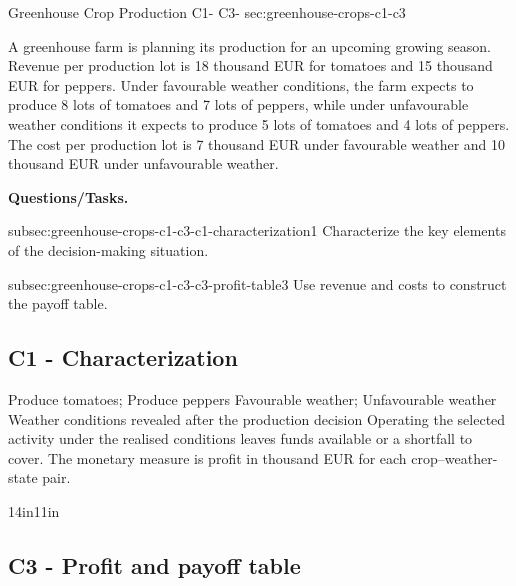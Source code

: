 	
	\sectionScored
	{Greenhouse Crop Production}
	{C1- \hspace{2mm} C3-}
	{sec:greenhouse-crops-c1-c3}
	{
		A greenhouse farm is planning its production for an upcoming growing
		season. Revenue per production lot is 18 thousand EUR for tomatoes and
		15 thousand EUR for peppers. Under favourable weather conditions, the
		farm expects to produce 8 lots of tomatoes and 7 lots of peppers, while
		under unfavourable weather conditions it expects to produce 5 lots of
		tomatoes and 4 lots of peppers. The cost per production lot is 7 thousand
		EUR under favourable weather and 10 thousand EUR under unfavourable
		weather.
		
		\textbf{Questions/Tasks.}
		\begin{enumerate}
			\CriterionTask
			{subsec:greenhouse-crops-c1-c3-c1-characterization}{1}
			{Characterize the key elements of the decision-making situation. }
			
			\CriterionTask
			{subsec:greenhouse-crops-c1-c3-c3-profit-table}{3}
			{Use revenue and costs to construct the payoff table. }
		\end{enumerate}
		
		\label{subsec:greenhouse-crops-c1-c3-c1-characterization}
		\subsection*{C1 - Characterization }
		
		\DecisionElementsTable
{Produce tomatoes; Produce peppers}
{Favourable weather; Unfavourable weather}
{Weather conditions revealed after the production decision}
{Operating the selected activity under the realised conditions leaves funds available or a shortfall to cover. The monetary measure is profit in thousand EUR for each crop--weather-state pair.}

		
		\begin{CalculationLandscape}{14in}{11in}
		\label{subsec:greenhouse-crops-c1-c3-c3-profit-table}
		\subsection*{C3 - Profit and payoff table }
		
		


\end{CalculationLandscape}}
